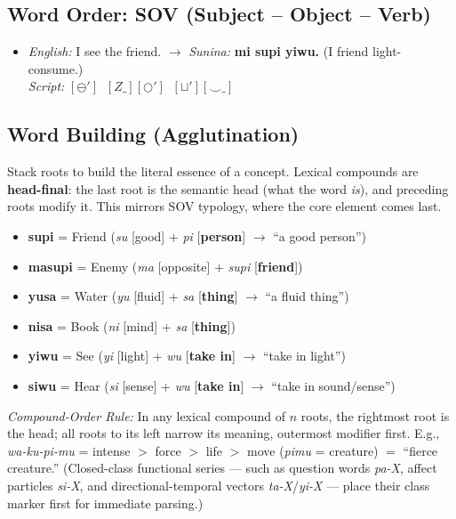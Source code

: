 \documentclass[12pt, a4paper]{article}
\begin{document}
\subsection{Word Order: SOV (Subject -- Object -- Verb)}
\begin{itemize}
    \item \textit{English:} I see the friend. \quad $\rightarrow$ \quad \textit{Sunina:} \textbf{mi supi yiwu.} \quad (I friend light-consume.) \\
    \textit{Script:} $[\ominus'] \;\; [Z\_][\bigcirc'] \;\; [\sqcup'][\smile\_]$
\end{itemize}

\subsection{Word Building (Agglutination)}
Stack roots to build the literal essence of a concept. Lexical compounds are \textbf{head-final}: the last root is the semantic head (what the word \textit{is}), and preceding roots modify it. This mirrors SOV typology, where the core element comes last.
\begin{itemize}
    \item \textbf{supi} = Friend (\textit{su} [good] + \textit{pi} [\textbf{person}] $\rightarrow$ ``a good person'')
    \item \textbf{masupi} = Enemy (\textit{ma} [opposite] + \textit{supi} [\textbf{friend}])
    \item \textbf{yusa} = Water (\textit{yu} [fluid] + \textit{sa} [\textbf{thing}] $\rightarrow$ ``a fluid thing'')
    \item \textbf{nisa} = Book (\textit{ni} [mind] + \textit{sa} [\textbf{thing}])
    \item \textbf{yiwu} = See (\textit{yi} [light] + \textit{wu} [\textbf{take in}] $\rightarrow$ ``take in light'')
    \item \textbf{siwu} = Hear (\textit{si} [sense] + \textit{wu} [\textbf{take in}] $\rightarrow$ ``take in sound/sense'')
\end{itemize}
\textit{Compound-Order Rule:} In any lexical compound of $n$ roots, the rightmost root is the head; all roots to its left narrow its meaning, outermost modifier first. E.g., \textit{wa-ku-pi-mu} = intense $>$ force $>$ life $>$ move (\textit{pimu} = creature) $=$ ``fierce creature.'' (Closed-class functional series --- such as question words \textit{pa-X}, affect particles \textit{si-X}, and directional-temporal vectors \textit{ta-X}/\textit{yi-X} --- place their class marker first for immediate parsing.)
\end{document}
